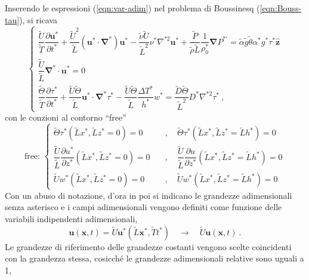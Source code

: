 \documentclass{article}
\begin{document}
Inserendo le espressioni (\ref{eqn:var-adim}) nel problema di Boussinesq (\ref{eqn:Bouss-tau}), si ricava
\begin{equation}\label{eqn:Bouss-tau-adim-1}
    \begin{cases}
      \dfrac{\tilde{U}}{\tilde{T}}\dfrac{\partial \bm{u}^*}{\partial t^*} + \dfrac{\tilde{U}^2}{\tilde{L}}
      \left( \bm{u}^* \cdot \bm{\nabla}^* \right) \bm{u}^* -
      \dfrac{\tilde{\nu} \tilde{U}}{\tilde{L}^2} \nu^* \nabla^{*2} \bm{u}^* + \dfrac{\tilde{P}}{\tilde{\rho} \tilde{L}}\dfrac{1}{\rho_0^*}\bm{\nabla} P^{*'} = \tilde{\alpha} \tilde{g} \tilde{\theta} \alpha^*  g^* \tau^* \bm{\hat{z}} \\
      \dfrac{\tilde{U}}{\tilde{L}}\bm{\nabla}^* \cdot \bm{u}^* = 0 \\
      \dfrac{\tilde{\Theta}}{\tilde{T}}\dfrac{\partial \tau^*}{\partial t^*} + \dfrac{\tilde{U}\tilde{\Theta}}{\tilde{L}}\bm{u}^* \cdot 
      \bm{\nabla}^* \tau^* - \dfrac{\tilde{U}\tilde{\Theta}}{\tilde{L}}\dfrac{\Delta T^*}{h^*} w^* = \dfrac{\tilde{D}\tilde{\Theta}}{\tilde{L}^2} D^* \nabla^{*2} \tau^* \ ,
    \end{cases}
\end{equation}
con le conzioni al contorno ``free''
\begin{equation}
    \text{free: } \left\{
    \begin{aligned}
      \tilde{\Theta}\tau^*(\tilde{L}x^*,\tilde{L}z^*=0) = 0 \quad & , \quad  
      \tilde{\Theta}\tau^*(\tilde{L}x^*,\tilde{L}z^*=\tilde{L}h^*) = 0 \\
      \dfrac{\tilde{U}}{\tilde{L}}\dfrac{\partial u^*}{\partial z^*}(\tilde{L}x^*,\tilde{L}z^*=0) = 0 \quad  & , \quad 
      \dfrac{\tilde{U}}{\tilde{L}}\dfrac{\partial u}{\partial z^*}(\tilde{L}x^*,\tilde{L}z^*=\tilde{L}h^*) = 0 \\
      \tilde{U} w^*(\tilde{L}x^*,\tilde{L}z^*=0) = 0 \quad  & , \quad 
      \tilde{U} w^*(\tilde{L}x^*,\tilde{L}z^*=\tilde{L}h^*) = 0
    \end{aligned} \right.
\end{equation}
Con un abuso di notazione, d'ora in poi si indicano le grandezze adimensionali senza asterisco e i campi adimensionali vengono definiti come funzione delle variabili indipendenti adimensionali,
\begin{equation}
    \bm{u}(\bm{x},t) = \tilde{U} \bm{u}^*(\tilde{L} \bm{x}^*, \tilde{T} t^*) \quad \rightarrow \quad \tilde{U} \bm{u}(\bm{x},  t) \ .
\end{equation}
Le grandezze di riferimento delle grandezze costanti vengono scelte coincidenti con la grandezza stessa, cosicché le grandezze adimensionali relative sono uguali a 1,
\end{document}
